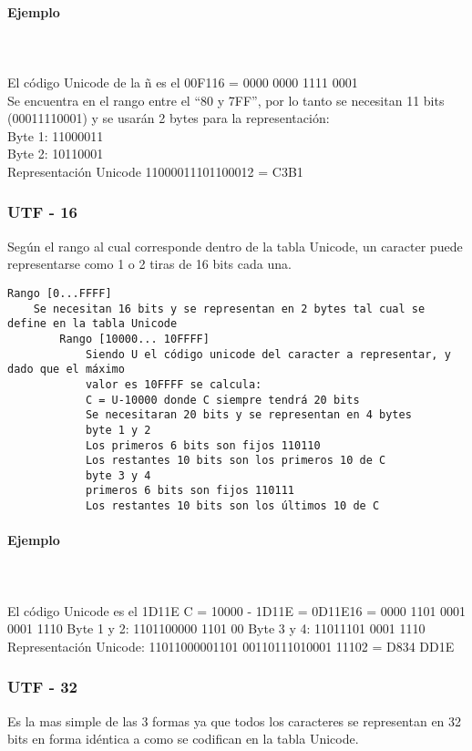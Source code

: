 \paragraph{Ejemplo}\mbox{}\\\\
El código Unicode de la ñ es el 00F116 = 0000 0000 1111 0001\\
    Se encuentra en el rango entre el “80 y 7FF”, por lo tanto se necesitan 11 bits (00011110001) y se usarán 2 bytes para la representación:\\
        Byte 1: 11000011\\
        Byte 2: 10110001\\
            Representación Unicode 11000011101100012 = C3B1
  
\subsubsection{UTF - 16}
Según el rango al cual corresponde dentro de la tabla Unicode, un caracter puede representarse como 1 o 2 tiras de 16 bits cada una.

\begin{verbatim}
Rango [0...FFFF]
	Se necesitan 16 bits y se representan en 2 bytes tal cual se define en la tabla Unicode
		Rango [10000... 10FFFF]
			Siendo U el código unicode del caracter a representar, y dado que el máximo
			valor es 10FFFF se calcula:
			C = U-10000 donde C siempre tendrá 20 bits
			Se necesitaran 20 bits y se representan en 4 bytes
			byte 1 y 2
			Los primeros 6 bits son fijos 110110
			Los restantes 10 bits son los primeros 10 de C
			byte 3 y 4
			primeros 6 bits son fijos 110111
			Los restantes 10 bits son los últimos 10 de C
\end{verbatim}


\paragraph{Ejemplo}\mbox{}\\\\
El código Unicode es el 1D11E
			C = 10000 - 1D11E = 0D11E16 = 0000 1101 0001 0001 1110
			Byte 1 y 2: 1101100000 1101 00
			Byte 3 y 4: 11011101 0001 1110
			Representación Unicode:
			11011000001101 00110111010001 11102 = D834 DD1E
			
\subsubsection{UTF - 32}
Es la mas simple de las 3 formas ya que todos los caracteres se representan en 32 bits en forma idéntica a como se codifican en la tabla Unicode.


